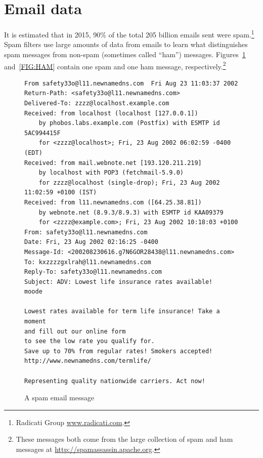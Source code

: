 \documentclass[12pt,oneside]{book}\usepackage[]{graphicx}\usepackage[]{color}
\begin{document}
\section{Email data}
It is estimated that in 2015, 90\% of the total 205 billion emails sent were spam.\footnote{Radicati Group \url{www.radicati.com}.} Spam filters use large amounts of data from emails to learn what distinguishes spam messages from non-spam (sometimes called ``ham'') messages. Figures~\ref{FIG:SPAM} and~\ref{FIG:HAM} contain one spam and one ham message, respectively.\footnote{These messages both come from the large collection of spam and ham messages at \url{http://spamassassin.apache.org}.}
\begin{figure}[H]
\begin{Verbatim}[fontsize = \small]
From safety33o@l11.newnamedns.com  Fri Aug 23 11:03:37 2002
Return-Path: <safety33o@l11.newnamedns.com>
Delivered-To: zzzz@localhost.example.com
Received: from localhost (localhost [127.0.0.1])
	by phobos.labs.example.com (Postfix) with ESMTP id 5AC994415F
	for <zzzz@localhost>; Fri, 23 Aug 2002 06:02:59 -0400 (EDT)
Received: from mail.webnote.net [193.120.211.219]
	by localhost with POP3 (fetchmail-5.9.0)
	for zzzz@localhost (single-drop); Fri, 23 Aug 2002 11:02:59 +0100 (IST)
Received: from l11.newnamedns.com ([64.25.38.81])
	by webnote.net (8.9.3/8.9.3) with ESMTP id KAA09379
	for <zzzz@example.com>; Fri, 23 Aug 2002 10:18:03 +0100
From: safety33o@l11.newnamedns.com
Date: Fri, 23 Aug 2002 02:16:25 -0400
Message-Id: <200208230616.g7N6GOR28438@l11.newnamedns.com>
To: kxzzzzgxlrah@l11.newnamedns.com
Reply-To: safety33o@l11.newnamedns.com
Subject: ADV: Lowest life insurance rates available!                                                   
moode

Lowest rates available for term life insurance! Take a moment 
and fill out our online form 
to see the low rate you qualify for. 
Save up to 70% from regular rates! Smokers accepted! 
http://www.newnamedns.com/termlife/ 
          
Representing quality nationwide carriers. Act now!
\end{Verbatim}
\caption{A spam email message}
\label{FIG:SPAM}
\end{figure}
\end{document}
